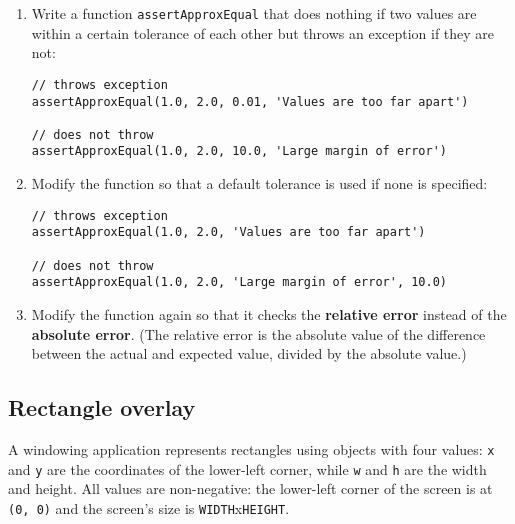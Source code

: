 \documentclass[krantzl]{krantz}
\newcommand{\glossref}[1]{\textbf{#1}}
\begin{document}
\begin{enumerate}

\item 

Write a function \texttt{assertApproxEqual} that does nothing if two values are within a certain tolerance of each other
    but throws an exception if they are not:

\begin{lstlisting}[frame=single,frameround=tttt]
// throws exception
assertApproxEqual(1.0, 2.0, 0.01, 'Values are too far apart')

// does not throw
assertApproxEqual(1.0, 2.0, 10.0, 'Large margin of error')
\end{lstlisting}



\item 

Modify the function so that a default tolerance is used if none is specified:

\begin{lstlisting}[frame=single,frameround=tttt]
// throws exception
assertApproxEqual(1.0, 2.0, 'Values are too far apart')

// does not throw
assertApproxEqual(1.0, 2.0, 'Large margin of error', 10.0)
\end{lstlisting}



\item 

Modify the function again so that it checks the \glossref{relative error}
    instead of the \glossref{absolute error}.
    (The relative error is the absolute value of the difference between the actual and expected value,
    divided by the absolute value.)



\end{enumerate}

\subsection*{Rectangle overlay}


A windowing application represents rectangles using objects with four values:
\texttt{x} and \texttt{y} are the coordinates of the lower-left corner,
while \texttt{w} and \texttt{h} are the width and height.
All values are non-negative:
the lower-left corner of the screen is at \texttt{(0, 0)}
and the screen's size is \texttt{WIDTH}x\texttt{HEIGHT}.
\end{document}
